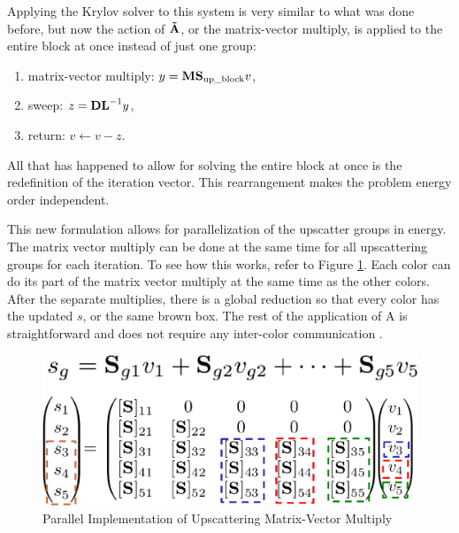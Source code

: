 Applying the Krylov solver to this system is very similar to what was done before, but now the action of $\mathbf{\tilde{A}}$, or the matrix-vector multiply, is applied to the entire block at once instead of just one group:
%
\begin{enumerate}
  \item matrix-vector multiply: $y = \mathbf{M}\mathbf{S}_{\text{up\_block}} v$,
  \item sweep: $z = \mathbf{DL}^{-1} y$,
  \item return: $v \leftarrow v - z$.
\end{enumerate}
%
All that has happened to allow for solving the entire block at once is the redefinition of the iteration vector. This rearrangement makes the problem energy order independent. 

This new formulation allows for parallelization of the upscatter groups in energy. The matrix vector multiply can be done at the same time for all upscattering groups for each iteration. To see how this works, refer to Figure \ref{fig:KrylovMultiply}. Each color can do its part of the matrix vector multiply at the same time as the other colors. After the separate multiplies, there is a global reduction so that every color has the updated $s$, or the same brown box. The rest of the application of A is straightforward and does not require any inter-color communication \cite{Evans2010}.
%
\begin{figure}[!h]
  \begin{center}
    \includegraphics [width=.6\textwidth, height=0.2\textheight ] {KrylovGroupMultiply}
  \end{center}
  \caption{Parallel Implementation of Upscattering Matrix-Vector Multiply}
  \label{fig:KrylovMultiply}
\end{figure}

